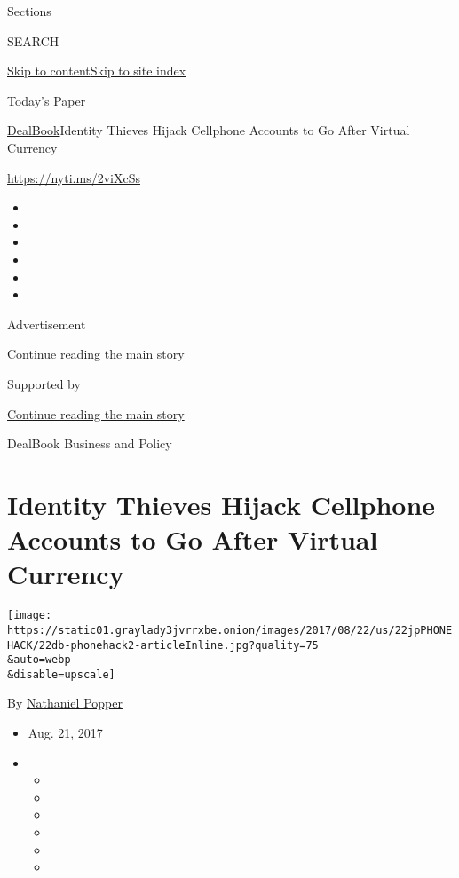 Sections

SEARCH

\protect\hyperlink{site-content}{Skip to
content}\protect\hyperlink{site-index}{Skip to site index}

\href{https://myaccount.nytimes3xbfgragh.onion/auth/login?response_type=cookie\&client_id=vi}{}

\href{https://www.nytimes3xbfgragh.onion/section/todayspaper}{Today's
Paper}

\href{/section/business/dealbook}{DealBook}\textbar{}Identity Thieves
Hijack Cellphone Accounts to Go After Virtual Currency

\href{https://nyti.ms/2viXcSs}{https://nyti.ms/2viXcSs}

\begin{itemize}
\item
\item
\item
\item
\item
\item
\end{itemize}

Advertisement

\protect\hyperlink{after-top}{Continue reading the main story}

Supported by

\protect\hyperlink{after-sponsor}{Continue reading the main story}

DealBook Business and Policy

\hypertarget{identity-thieves-hijack-cellphone-accounts-to-go-after-virtual-currency}{%
\section{Identity Thieves Hijack Cellphone Accounts to Go After Virtual
Currency}\label{identity-thieves-hijack-cellphone-accounts-to-go-after-virtual-currency}}

\texttt{[image: https://static01.graylady3jvrrxbe.onion/images/2017/08/22/us/22jpPHONEHACK/22db-phonehack2-articleInline.jpg?quality=75\\\&auto=webp\\\&disable=upscale]}

By
\href{http://www.nytimes3xbfgragh.onion/by/nathaniel-popper}{Nathaniel
Popper}

\begin{itemize}
\item
  Aug. 21, 2017
\item
  \begin{itemize}
  \item
  \item
  \item
  \item
  \item
  \item
  \end{itemize}
\end{itemize}

